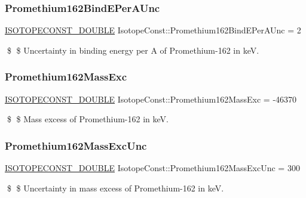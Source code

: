 \subsubsection{\texorpdfstring{Promethium162\+Bind\+E\+Per\+A\+Unc}{Promethium162BindEPerAUnc}}
{\footnotesize\ttfamily \mbox{\hyperlink{group___isotope_const-_macros_ga8f45a7272ce02c0b4c65c44636ed719a}{I\+S\+O\+T\+O\+P\+E\+C\+O\+N\+S\+T\+\_\+\+D\+O\+U\+B\+LE}} Isotope\+Const\+::\+Promethium162\+Bind\+E\+Per\+A\+Unc = 2}

\$ \$ Uncertainty in binding energy per A of Promethium-\/162 in keV. \mbox{\label{group___isotope_const-_promethium-_pm162_gabd7f8c791acbcd81809ca4e8872c1cba}} 
\subsubsection{\texorpdfstring{Promethium162\+Mass\+Exc}{Promethium162MassExc}}
{\footnotesize\ttfamily \mbox{\hyperlink{group___isotope_const-_macros_ga8f45a7272ce02c0b4c65c44636ed719a}{I\+S\+O\+T\+O\+P\+E\+C\+O\+N\+S\+T\+\_\+\+D\+O\+U\+B\+LE}} Isotope\+Const\+::\+Promethium162\+Mass\+Exc = -\/46370}

\$ \$ Mass excess of Promethium-\/162 in keV. \mbox{\label{group___isotope_const-_promethium-_pm162_ga40b863f67ff442c05462699e775a98be}} 
\subsubsection{\texorpdfstring{Promethium162\+Mass\+Exc\+Unc}{Promethium162MassExcUnc}}
{\footnotesize\ttfamily \mbox{\hyperlink{group___isotope_const-_macros_ga8f45a7272ce02c0b4c65c44636ed719a}{I\+S\+O\+T\+O\+P\+E\+C\+O\+N\+S\+T\+\_\+\+D\+O\+U\+B\+LE}} Isotope\+Const\+::\+Promethium162\+Mass\+Exc\+Unc = 300}

\$ \$ Uncertainty in mass excess of Promethium-\/162 in keV. \mbox{\label{group___isotope_const-_promethium-_pm162_ga5358b4eb7dfb42b98f19859640707a99}} 
